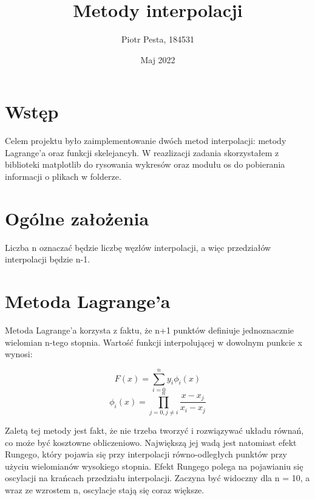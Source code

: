 \documentclass[fleqn]{article}
\title{Metody interpolacji}
\author{Piotr Pesta, 184531}
\date{Maj 2022}
\begin{document}
\maketitle


\section{Wstęp}
    Celem projektu było zaimplementowanie dwóch metod interpolacji: metody Lagrange'a oraz funkcji skelejancyh.
    W reazlizacji zadania skorzystałem z biblioteki matplotlib do rysowania wykresów oraz modułu os do pobierania informacji o plikach w folderze.

\section{Ogólne założenia}
    Liczba n oznaczać będzie liczbę węzłów interpolacji, a więc przedziałów interpolacji będzie n-1.
\newpage
\section{Metoda Lagrange'a}
    Metoda Lagrange'a korzysta z faktu, że n+1 punktów definiuje jednoznacznie wielomian n-tego stopnia. 
    Wartość funkcji interpolującej w dowolnym punkcie x wynosi:

    
    \[ 
        F(x) = \sum_{i = 0}^{n} y_i\phi_i(x)   
   \]
   \[
        \phi_i(x) = \prod_{j=0, j \neq i}^n \frac{x - x_j}{x_i - x_j}     
   \]

    \noindent Zaletą tej metody jest fakt, że nie trzeba tworzyć i rozwiązywać układu równań, co może być kosztowne obliczeniowo.
    Największą jej wadą jest natomiast efekt Rungego, który pojawia się przy interpolacji równo-odległych punktów przy użyciu wielomianów
    wysokiego stopnia. Efekt Rungego polega na pojawianiu się oscylacji na krańcach przedziału interpolacji. Zaczyna być widoczny dla n = 10,
    a wraz ze wzrostem n, oscylacje stają się coraz większe.
\end{document}
